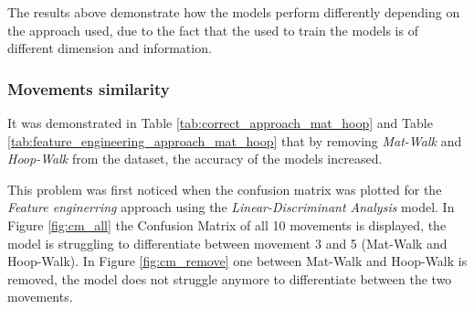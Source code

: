             The results above demonstrate how the models perform differently depending on the approach used, due to the fact that the used to train the models is of different dimension and information. 

        \subsubsection{Movements similarity}   
        
            It was demonstrated in Table \ref{tab:correct_approach_mat_hoop} and Table \ref{tab:feature_engineering_approach_mat_hoop} that by removing \textit{Mat-Walk} and \textit{Hoop-Walk} from the dataset, the accuracy of the models increased.

            This problem was first noticed when the confusion matrix was plotted for the \textit{Feature enginerring} approach using the \textit{Linear-Discriminant Analysis} model. In
            Figure \ref{fig:cm_all} the Confusion Matrix of all 10 movements is displayed, the model is struggling to differentiate between movement 3 and 5 (Mat-Walk and Hoop-Walk). In Figure \ref{fig:cm_remove} one between Mat-Walk and Hoop-Walk is removed, the model does not struggle anymore to differentiate between the two movements.
            
